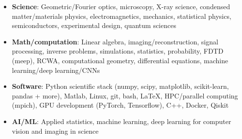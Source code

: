 \begin{itemize}
    \item \textbf{Science}: Geometric/Fourier optics, microscopy, X-ray science, condensed matter/materials physics, electromagnetics, mechanics, statistical physics, semiconductors, experimental design, quantum sciences \par
    \item \textbf{Math/computation}: Linear algebra, imaging/reconstruction, signal processing, inverse problems, simulations, statistics, probability, FDTD (meep), RCWA, computational geometry, differential equations, machine learning/deep learning/CNNs \par
    \item \textbf{Software}: Python scientific stack (numpy, scipy, matplotlib, scikit-learn, pandas + more), Matlab, Linux, git, bash, \LaTeX, HPC/parallel computing (mpich), GPU development (PyTorch, Tensorflow), C++, Docker, Qiskit \par
    \item\textbf{AI/ML}: Applied statistics, machine learning, deep learning for computer vision and imaging in science \par
\end{itemize}
